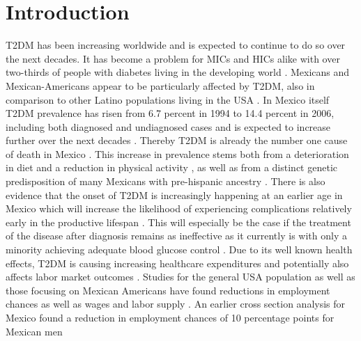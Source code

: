 \documentclass[12pt,english,british]{article}
\begin{document}
\section{\label{sec:Introduction}Introduction }

\ac{T2DM} has been increasing worldwide and is expected to continue to do so over the next decades. It has become a problem for \ac{MICs} and \ac{HICs} alike with over two-thirds of people with diabetes living in the developing world \citep{InternationalDiabetesFederation2013}. Mexicans and Mexican-Americans appear to be particularly affected by \ac{T2DM}, also in comparison to other Latino populations living in the \ac{USA} \citep{Schneiderman2014}. In Mexico itself \ac{T2DM} prevalence has risen from 6.7 percent in 1994 to 14.4 percent in 2006, including both diagnosed and undiagnosed cases \citep{Barquera2013} and is expected to increase further over the next decades \citep{Meza2015}. Thereby \ac{T2DM} is already the number one cause of death in Mexico \citep{Barquera2013}. This increase in prevalence stems  both from a deterioration in diet and a reduction in physical activity \citep{Barquera2008b,Basu2013}, as well as from a distinct genetic predisposition of many Mexicans with pre-hispanic ancestry \citep{Williams2013}. There is also evidence that  the onset of \ac{T2DM} is increasingly happening at an earlier age in Mexico \citep{Villalpando2010} which will increase the likelihood of experiencing complications relatively early in the productive lifespan \citep{Barquera2013}. This will especially be the case if the treatment of the disease after diagnosis remains as ineffective as it currently is with only a minority achieving adequate blood glucose control \citep{Barquera2013}. Due to its well known health effects, \ac{T2DM} is causing increasing healthcare expenditures and potentially also affects labor market outcomes \citep{Seuring2015a}. Studies for the general \ac{USA} population as well as those focusing on Mexican Americans have found reductions in employment chances as well as wages and labor supply \citep{Brown2005,Brown2014,BrownIII2011,Minor2010,Minor2013}. An earlier cross section analysis for Mexico found a reduction in employment chances of 10 percentage points for Mexican men \citep{Seuring2015} 
\end{document}
